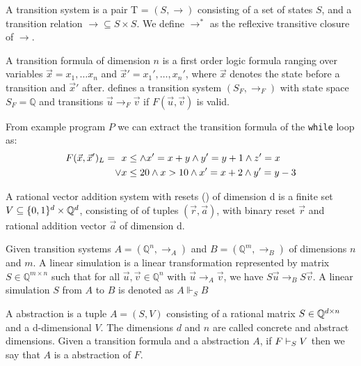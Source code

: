 \begin{mydef}
A transition system is a pair T = $(S, \rightarrow)$ consisting of a set of states $S$, and a transition relation $\rightarrow \subseteq S \times S$. We define $\rightarrow^*$ as the reflexive transitive closure of $\rightarrow$.
\end{mydef}

\begin{mydef}
A transition formula \tranFormula of dimension $n$ is a first order logic formula ranging over variables $\vec{x} = x_1, \ldots x_n$ and $\vec{x}' = x_1', \ldots, x_n'$, where $\vec{x}$ denotes the state before a transition and $\vec{x}'$ after. \tranFormula defines a transition system $(S_F, \rightarrow_F)$ with state space $S_F = \mathbb{Q}$ and transitions $\vec{u} \rightarrow_F \vec{v}$ if $F(\vec{u}, \vec{v})$ is valid.
\end{mydef}
\begin{example}
    From example program $P$ we can extract the transition formula of the \texttt{while} loop as:
    \begin{align*}
    F(\vec{x}, \vec{x}')_L =\ \  &x \leq \land x' = x + y \land y' = y+1 \land z' = x \\ \lor & x \leq 20 \land x > 10 \land x' = x + 2 \land y' = y - 3
    \end{align*}
\end{example}

\begin{mydef}
A rational vector addition system with resets (\qvasr) of dimension d is a finite set $V \subseteq \{0, 1\}^d \times \mathbb{Q}^d$, consisting of of tuples $(\vec{r}, \vec{a})$, with binary reset $\vec{r}$ and rational addition vector $\vec{a}$ of dimension d.
\end{mydef}

\begin{mydef}
Given transition systems $A = (\mathbb{Q}^n, \rightarrow_A)$ and $B = (\mathbb{Q}^m, \rightarrow_B)$ of dimensions $n$ and $m$. A linear simulation is a linear transformation represented by matrix $S \in \mathbb{Q}^{m \times n}$ such that for all $\vec{u}, \vec{v} \in \mathbb{Q}^n$ with $\vec{u} \rightarrow_A \vec{v}$, we have $S\vec{u} \rightarrow_B S\vec{v}$. A linear simulation $S$ from $A$ to $B$ is denoted as $A \Vdash_{S} B$
\end{mydef}

\begin{mydef}
A \qvasr abstraction is a tuple $A = (S, V)$ consisting of a rational matrix $S \in \mathbb{Q}^{d \times n}$ and a d-dimensional \qvasr $V$. The dimensions $d$ and $n$ are called concrete and abstract dimensions.
Given a transition formula \tranFormula and a \qvasr abstraction $A$, if $F \vdash_{S} V$ then we say that $A$ is a \qvasr abstraction of $F$.
\end{mydef}

